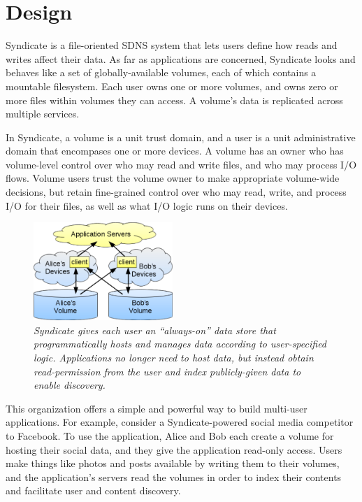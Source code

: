 \section{Design}
\label{sec:design}

Syndicate is a file-oriented SDNS system that lets users define how reads and
writes affect their data.  As far as applications are concerned, Syndicate looks
and behaves like a set of globally-available volumes, each of which contains a
mountable filesystem. Each user owns one or more volumes, and owns zero or more
files within volumes they can access.  A volume's data is replicated across
multiple services.

In Syndicate, a volume is a unit trust domain, and a user is a unit
administrative domain that encompases one or more devices.  A volume has an
owner who has volume-level control over who may read and write files, and who
may process I/O flows. Volume users trust the volume owner to make appropriate
volume-wide decisions, but retain fine-grained control over who may read, write,
and process I/O for their files, as well as what I/O logic runs on their
devices.

\begin{figure}[t!]
\centering
\includegraphics[width=0.47\textwidth]{figures/app-overview}
\caption{\it
Syndicate gives each user an ``always-on'' data store that programmatically
hosts and manages data according to user-specified logic.  Applications no
longer need to host data, but instead obtain read-permission from the user and
index publicly-given data to enable discovery.}
\label{fig:app-overview}
\end{figure}

This organization offers a simple and powerful way to build multi-user
applications. For example, consider a Syndicate-powered social media competitor
to Facebook. To use the application, Alice and Bob each create a volume for
hosting their social data, and they give the application read-only access. Users
make things like photos and posts available by writing them to their volumes,
and the application's servers read the volumes in order to index their
contents and facilitate user and content discovery.

